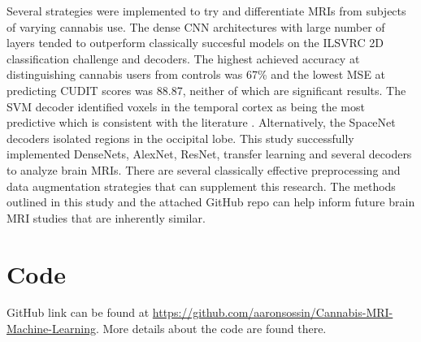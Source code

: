 \documentclass[conference]{IEEEtran}
\begin{document}


Several strategies were implemented to try and differentiate MRIs from subjects of varying cannabis use. The dense CNN architectures with large number of layers tended to outperform classically succesful models on the ILSVRC 2D classification challenge and decoders. The highest achieved accuracy at distinguishing cannabis users from controls was 67\% and the lowest MSE at predicting CUDIT scores was 88.87, neither of which are significant results. The SVM decoder identified voxels in the temporal cortex as being the most predictive which is consistent with the literature \cite{b5}\cite{b6}\cite{b7}. Alternatively, the SpaceNet decoders isolated regions in the occipital lobe. This study successfully implemented DenseNets, AlexNet, ResNet, transfer learning and several decoders to analyze brain MRIs.
There are several classically effective preprocessing and data augmentation strategies that can supplement this research. The methods outlined in this study and the attached GitHub repo can help inform future brain MRI studies that are inherently similar.

\section*{Code}
GitHub link can be found at \url{https://github.com/aaronsossin/Cannabis-MRI-Machine-Learning}. More details about the code are found there. 
\end{document}
